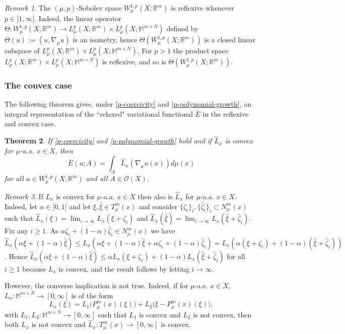 \documentclass[10pt]{amsart}
\numberwithin{equation}{section}
\newtheorem{theorem}{Theorem}[section]
\theoremstyle{definition}
\theoremstyle{remark}
\newtheorem{remark}[theorem]{Remark}
\begin{document}
\begin{remark}\label{ReFLeXIVITY-of-Metric-SObOlev-Spaces}
The $(\mu,p)$-Sobolev space $W^{1,p}_\mu(X;{{\mathbb R}}^m)$ is reflexive whenever $p\in]1,\infty[$. Indeed, the linear operator $\Theta:W^{1,p}_\mu(X;{{\mathbb R}}^m)\to L^p_\mu(X;{{\mathbb R}}^m)\times L^p_\mu(X;{{\mathbb M}^{m\times N}})$ defined by $\Theta(u):=(u,\nabla_\mu u)$ is an isometry, hence $\Theta(W^{1,p}_\mu(X;{{\mathbb R}}^m))$ is a closed linear subspace of $L^p_\mu(X;{{\mathbb R}}^m)\times L^p_\mu(X;{{\mathbb M}^{m\times N}})$. For $p>1$ the product space $L^p_\mu(X;{{\mathbb R}}^m)\times L^p_\mu(X;{{\mathbb M}^{m\times N}})$ is reflexive, and so is $\Theta(W^{1,p}_\mu(X;{{\mathbb R}}^m))$.
\end{remark}

\subsubsection{The convex case} The following theorem gives, under \eqref{p-coercivity} and \eqref{p-polynomial-growth}, an integral representation of the ``relaxed" variational functional $\overline{E}$ in the reflexive and convex case. 

\begin{theorem}\label{Main-Theorem-Convex}
If \eqref{p-coercivity} and \eqref{p-polynomial-growth} hold and if $\widehat{L}_x$ is convex for $\mu$-a.a. $x\in X$, then
$$
\overline{E}(u;A)=\int_A \widehat{L}_x(\nabla_\mu u(x))d\mu(x)
$$
for all $u\in W^{1,p}_\mu(X;{{\mathbb R}}^m)$ and all $A\in\mathcal{O}(X)$.
\end{theorem}

\begin{remark}
If $L_x$ is convex for $\mu$-a.a. $x\in X$  then also is $\widehat{L}_x$ for $\mu$-a.a. $x\in X$. Indeed, let $\alpha\in]0,1[$ and let $\xi,\hat\xi\in T^m_\mu(x)$ and consider  $\{\zeta_i\}_i,\{\hat\zeta_i\}_i\subset N^m_\mu(x)$ such that $\widehat{L}_x(\xi)=\lim_{i\to\infty}L_x(\xi+\zeta_i)$ and $\widehat{L}_x(\hat\xi)=\lim_{i\to\infty}L_x(\hat\xi+\hat\zeta_i)$. Fix any $i\geq 1$. As $\alpha\zeta_i+(1-\alpha)\hat\zeta_i\in N^m_\mu(x)$ we have $\widehat{L}_x(\alpha\xi+(1-\alpha)\hat\xi)\leq L_x(\alpha\xi+(1-\alpha)\hat\xi+\alpha\zeta_i+(1-\alpha)\hat\zeta_i)=L_x(\alpha(\xi+\zeta_i)
+(1-\alpha)(\hat\xi+\hat\zeta_i))$. Hence $\widehat{L}_x(\alpha\xi+(1-\alpha)\hat\xi)\leq\alpha L_x(\xi+\zeta_i)+(1-\alpha)L_x(\hat\xi+\hat\zeta_i)$ for all $i\geq 1$ because $L_x$ is convex, and the result follows by letting $i\to\infty$.

However, the converse implication is not true. Indeed, if for $\mu$-a.e. $x\in X$, $L_x:{{\mathbb M}^{m\times N}}\to[0,\infty]$ is of the form
$$
L_x(\xi)=L_1\big(P^m_\mu(x)(\xi)\big)+L_2\big(\xi-P^m_\mu(x)(\xi)\big),
$$
with $L_1,L_2:{{\mathbb M}^{m\times N}}\to[0,\infty]$ such that $L_1$ is convex and $L_2$ is not convex, then both $L_x$ is not convex and $\widehat{L}_x:T^m_\mu(x)\to[0,\infty]$ is convex.
\end{remark}
\end{document}
